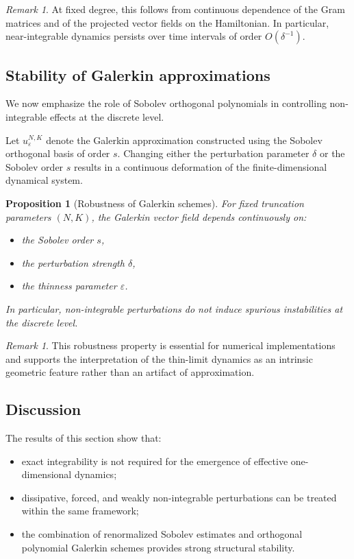 \documentclass[11pt]{amsart}
\theoremstyle{plain}
\newtheorem{proposition}[theorem]{Proposition}
\theoremstyle{definition}
\theoremstyle{remark}
\newtheorem{remark}[theorem]{Remark}
\theoremstyle{remark}
\begin{document}
\begin{remark}
At fixed degree, this follows from continuous dependence of the Gram matrices
and of the projected vector fields on the Hamiltonian.
In particular, near-integrable dynamics persists over time intervals of order
$O(\delta^{-1})$.
\end{remark}

\subsection{Stability of Galerkin approximations}

We now emphasize the role of Sobolev orthogonal polynomials in controlling
non-integrable effects at the discrete level.

Let $u_\varepsilon^{N,K}$ denote the Galerkin approximation constructed using the
Sobolev orthogonal basis of order $s$.
Changing either the perturbation parameter $\delta$ or the Sobolev order $s$
results in a continuous deformation of the finite-dimensional dynamical system.

\begin{proposition}[Robustness of Galerkin schemes]
\label{prop:robust-galerkin}
For fixed truncation parameters $(N,K)$, the Galerkin vector field depends
continuously on:
\begin{itemize}
\item the Sobolev order $s$,
\item the perturbation strength $\delta$,
\item the thinness parameter $\varepsilon$.
\end{itemize}
In particular, non-integrable perturbations do not induce spurious instabilities
at the discrete level.
\end{proposition}

\begin{remark}
This robustness property is essential for numerical implementations and
supports the interpretation of the thin-limit dynamics as an intrinsic geometric
feature rather than an artifact of approximation.
\end{remark}

\subsection{Discussion}

The results of this section show that:
\begin{itemize}
\item exact integrability is not required for the emergence of effective
one-dimensional dynamics;
\item dissipative, forced, and weakly non-integrable perturbations can be treated
within the same framework;
\item the combination of renormalized Sobolev estimates and orthogonal polynomial
Galerkin schemes provides strong structural stability.
\end{itemize}
\end{document}
